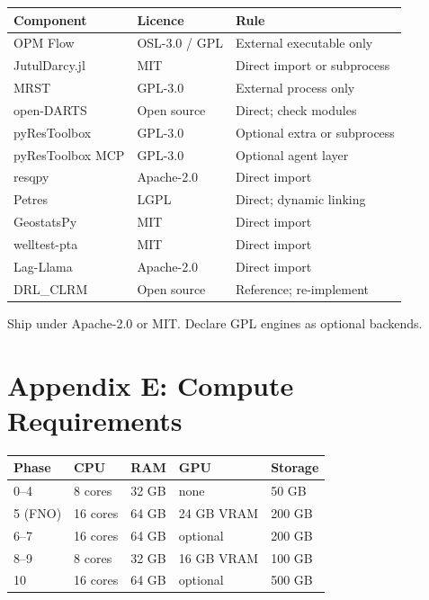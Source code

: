 \documentclass[10pt,a4paper]{article}
\begin{document}
\begin{longtable}{@{}p{3.6cm}p{2.6cm}p{7.0cm}@{}}
\toprule
Component & Licence & Rule\\
\midrule
OPM Flow & OSL-3.0 / GPL & External executable only\\
JutulDarcy.jl & MIT & Direct import or subprocess\\
MRST & GPL-3.0 & External process only\\
open-DARTS & Open source & Direct; check modules\\
pyResToolbox & GPL-3.0 & Optional extra or subprocess\\
pyResToolbox MCP & GPL-3.0 & Optional agent layer\\
resqpy & Apache-2.0 & Direct import\\
Petres & LGPL & Direct; dynamic linking\\
GeostatsPy & MIT & Direct import\\
welltest-pta & MIT & Direct import\\
Lag-Llama & Apache-2.0 & Direct import\\
DRL\_CLRM & Open source & Reference; re-implement\\
\bottomrule
\end{longtable}

Ship under Apache-2.0 or MIT. Declare GPL engines as optional backends.

\section{Appendix E: Compute Requirements}

\begin{longtable}{@{}p{3cm}p{2.4cm}p{2cm}p{2.6cm}p{3cm}@{}}
\toprule
Phase & CPU & RAM & GPU & Storage\\
\midrule
0--4 & 8 cores & 32 GB & none & 50 GB\\
5 (FNO) & 16 cores & 64 GB & 24 GB VRAM & 200 GB\\
6--7 & 16 cores & 64 GB & optional & 200 GB\\
8--9 & 8 cores & 32 GB & 16 GB VRAM & 100 GB\\
10 & 16 cores & 64 GB & optional & 500 GB\\
\bottomrule
\end{longtable}

\end{document}
